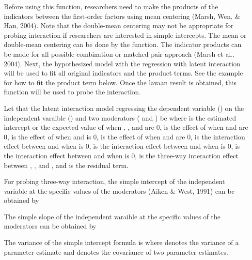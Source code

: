 \documentclass[a4paper]{book}
\begin{document}
\begin{Details}\relax
Before using this function, researchers need to make the products of the indicators between the first-order factors using mean centering (Marsh, Wen, \& Hau, 2004). Note that the double-mean centering may not be appropriate for probing interaction if researchers are interested in simple intercepts. The mean or double-mean centering can be done by the  function. The indicator products can be made for all possible combination or matched-pair approach (Marsh et al., 2004). Next, the hypothesized model with the regression with latent interaction will be used to fit all original indicators and the product terms. See the example for how to fit the product term below. Once the lavaan result is obtained, this function will be used to probe the interaction.

Let that the latent interaction model regressing the dependent variable () on the independent varaible () and two moderators ( and ) be
where  is the estimated intercept or the expected value of  when , , and  are 0,  is the effect of  when  and  are 0,  is the effect of  when  and  is 0,  is the effect of  when  and  are 0,  is the interaction effect between  and  when  is 0,  is the interaction effect between  and  when  is 0,  is the interaction effect between  and  when  is 0,  is the three-way interaction effect between , , and , and  is the residual term.

For probing three-way interaction, the simple intercept of the independent variable at the specific values of the moderators (Aiken \& West, 1991) can be obtained by

The simple slope of the independent varaible at the specific values of the moderators can be obtained by

The variance of the simple intercept formula is
where  denotes the variance of a parameter estimate and  denotes the covariance of two parameter estimates.


\end{Details}
\end{document}
